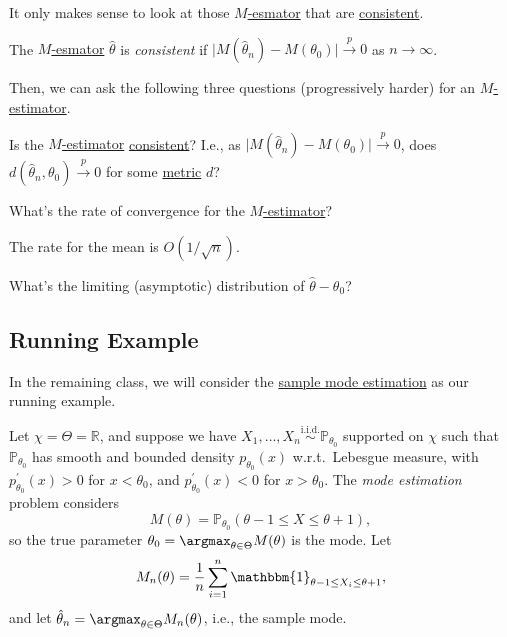 It only makes sense to look at those \hyperref[prb:M-estimation]{\(M\)-esmator} that are \hyperref[def:consistent]{consistent}.

\begin{definition}[Consistent]\label{def:consistent}
	The \hyperref[prb:M-estimation]{\(M\)-esmator} \(\hat{\theta} \) is \emph{consistent} if \(\vert M(\hat{\theta} _n) - M(\theta _0) \vert \overset{p}{\to } 0\) as \(n\to \infty \).
\end{definition}

Then, we can ask the following three questions (progressively harder) for an \hyperref[prb:M-estimation]{\(M\)-estimator}.

\begin{problem}[Consistency]\label{prb:consistency}
Is the \hyperref[prb:M-estimation]{\(M\)-estimator} \hyperref[def:consistent]{consistent}? I.e., as \(\vert M(\hat{\theta} _n) - M(\theta _0) \vert \overset{p}{\to } 0\), does \(d(\hat{\theta} _n, \theta _0) \overset{p}{\to } 0\) for some \hyperref[def:pseudo-metric]{metric} \(d\)?
\end{problem}

\begin{problem}\label{prb:rate-of-convergence}
What's the rate of convergence for the \hyperref[prb:M-estimation]{\(M\)-estimator}?
\end{problem}

\begin{eg}
	The rate for the mean is \(O(1 / \sqrt{n} )\).
\end{eg}

\begin{problem}\label{prb:limiting-distribution}
What's the limiting (asymptotic) distribution of \(\hat{\theta} - \theta _0\)?
\end{problem}

\subsection{Running Example}
In the remaining class, we will consider the \hyperref[eg:mode-estimation]{sample mode estimation} as our running example.

\begin{eg}\label{eg:mode-estimation}
	Let \(\chi = \Theta = \mathbb{R} \), and suppose we have \(X_1, \dots , X_n \overset{\text{i.i.d.} }{\sim } \mathbb{P} _{\theta _0}\) supported on \(\chi \) such that \(\mathbb{P} _{\theta _0}\) has smooth and bounded density \(p_{\theta _0} (x)\) w.r.t.\ Lebesgue measure, with \(p^{\prime} _{\theta _0} (x) > 0\) for \(x < \theta _0\), and \(p^{\prime} _{\theta _0} (x) < 0\) for \(x > \theta _0\). The \emph{mode estimation} problem considers
	\[
		M(\theta ) = \mathbb{P} _{\theta _0}(\theta -1 \leq X \leq \theta +1),
	\]
	so the true parameter \(\theta _0 = \argmax_{\theta \in \Theta } M(\theta )\) is the mode. Let
	\[
		M_n(\theta ) = \frac{1}{n} \sum_{i=1}^{n} \mathbbm{1}_{\theta -1 \leq X_i \leq \theta +1},
	\]
	and let \(\hat{\theta} _n = \argmax_{\theta \in \Theta } M_n(\theta )\), i.e., the sample mode.
\end{eg}

